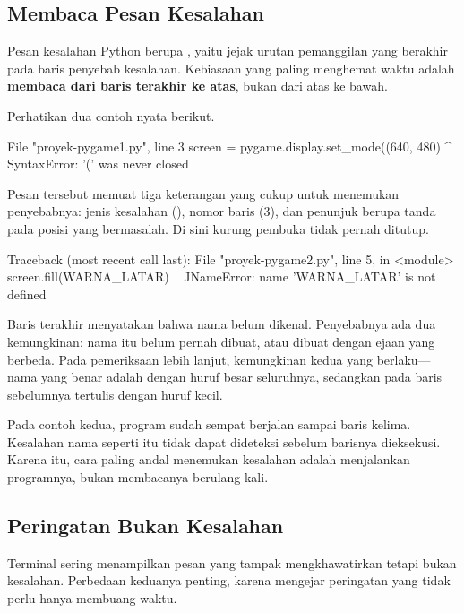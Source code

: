 \subsection{Membaca Pesan Kesalahan}

Pesan kesalahan Python berupa , yaitu jejak urutan
pemanggilan yang berakhir pada baris penyebab kesalahan. Kebiasaan yang paling
menghemat waktu adalah \textbf{membaca dari baris terakhir ke atas}, bukan dari
atas ke bawah.

Perhatikan dua contoh nyata berikut.

\begin{kodekeluaran}
File "proyek-pygame\code\galat1.py", line 3
    screen = pygame.display.set_mode((640, 480)
                                    ^
SyntaxError: '(' was never closed
\end{kodekeluaran}

Pesan tersebut memuat tiga keterangan yang cukup untuk menemukan penyebabnya:
jenis kesalahan (), nomor baris (3), dan penunjuk berupa tanda
\code{\^{}} pada posisi yang bermasalah. Di sini kurung pembuka
 tidak pernah ditutup.

\begin{kodekeluaran}
Traceback (most recent call last):
  File "proyek-pygame\code\galat2.py", line 5, in <module>
    screen.fill(WARNA_LATAR)
                ^^^^^^^^^^^
NameError: name 'WARNA_LATAR' is not defined
\end{kodekeluaran}

Baris terakhir menyatakan bahwa nama  belum dikenal.
Penyebabnya ada dua kemungkinan: nama itu belum pernah dibuat, atau dibuat
dengan ejaan yang berbeda. Pada pemeriksaan lebih lanjut, kemungkinan kedua
yang berlaku---nama yang benar adalah \code{WARNA_LATAR} dengan huruf besar
seluruhnya, sedangkan pada baris sebelumnya tertulis dengan huruf kecil.

Pada contoh kedua, program sudah sempat berjalan sampai baris
kelima. Kesalahan nama seperti itu tidak dapat dideteksi sebelum barisnya
dieksekusi. Karena itu, cara paling andal menemukan kesalahan adalah
menjalankan programnya, bukan membacanya berulang kali.

\subsection{Peringatan Bukan Kesalahan}

Terminal sering menampilkan pesan yang tampak mengkhawatirkan tetapi bukan
kesalahan. Perbedaan keduanya penting, karena mengejar peringatan yang tidak
perlu hanya membuang waktu.


